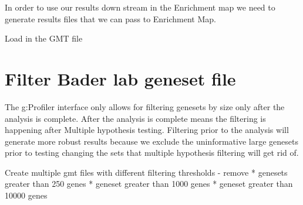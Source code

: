 \documentclass[
]{book}
\begin{document}
In order to use our results down stream in the Enrichment map we need to generate results files that we can pass to Enrichment Map.

Load in the GMT file

\section{Filter Bader lab geneset file}\label{filter-bader-lab-geneset-file}

The g:Profiler interface only allows for filtering genesets by size only after the analysis is complete. After the analysis is complete means the filtering is happening after Multiple hypothesis testing. Filtering prior to the analysis will generate more robust results because we exclude the uninformative large genesets prior to testing changing the sets that multiple hypothesis filtering will get rid of.

Create multiple gmt files with different filtering thresholds - remove
* genesets greater than 250 genes
* geneset greater than 1000 genes
* geneset greater than 10000 genes
\end{document}
